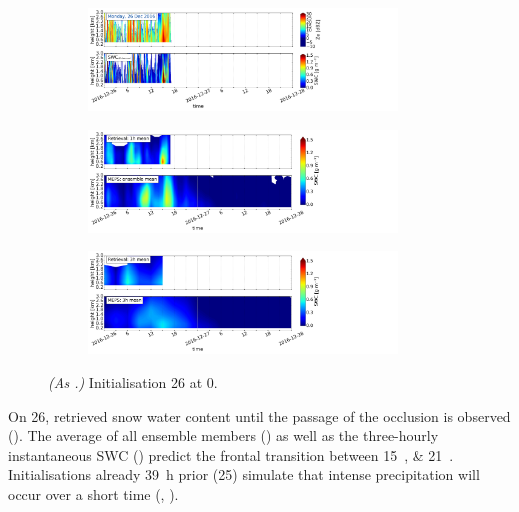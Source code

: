 \begin{figure}[H]%
	\centering
	\begin{subfigure}[t]{1.05\textwidth}
		\centering
		\includegraphics[trim={0.cm 2.2cm 19.cm 0.5cm},clip,width=0.9\textwidth]{./fig_obs_ret/20161226}
		\caption{}\label{fig:SWC:ret_26}
	\end{subfigure}
	\begin{subfigure}[t]{1.05\textwidth}
		\centering
		\includegraphics[trim={0.cm 2.2cm 19.cm 0.5cm},clip,width=0.9\textwidth]{./fig_vert_SWC_EM/20161226}
		\caption{}\label{fig:SWC_EM:26}
	\end{subfigure}
	\begin{subfigure}[t]{1.05\textwidth}
		\centering
		\includegraphics[trim={0.cm 0.8cm 19.cm 0.5cm},clip,width=0.9\textwidth]{./fig_vert_SWC_3h/20161226}
		\caption{}\label{fig:SWC3h:26}
	\end{subfigure}
	\caption{\textit{(As .)} Initialisation \SI{26}{\dec} at \SI{0}{\UTC}.}\label{fig:SWC26}
\end{figure}
%
\newpage
\noindent
On \SI{26}{\dec}, retrieved snow water content until the passage of the occlusion is observed (). The average of all ensemble members () as well as the three-hourly instantaneous SWC () predict the frontal transition between \SIlist{15;21}{\UTC}. Initialisations already \SI{39}{\hour} prior (\SI{25}{\dec}) simulate that intense precipitation will occur over a short time (, ). 
